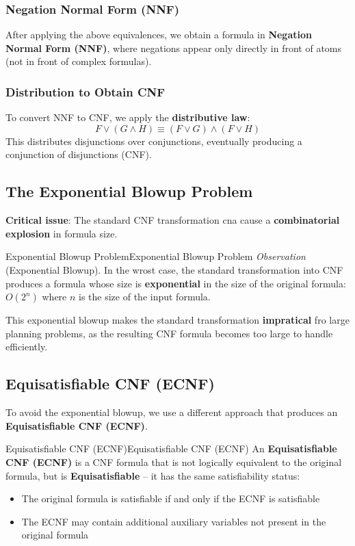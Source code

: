\documentclass[a4paper]{article}
\theoremstyle{definition}
\begin{document}
\subsubsection{Negation Normal Form (NNF)}
After applying the above equivalences, we obtain a formula in \textbf{Negation Normal Form (NNF)}, where negations appear only 
directly in front of atoms (not in front of complex formulas).
\subsubsection{Distribution to Obtain CNF}
To convert NNF to CNF, we apply the \textbf{distributive law}:
\[
  F \vee (G \wedge H) \equiv (F \vee G) \wedge (F \vee H)
\]
This distributes disjunctions over conjunctions, eventually producing a conjunction of disjunctions (CNF).
\subsection{The Exponential Blowup Problem}
\textbf{Critical issue}: The standard CNF transformation cna cause a \textbf{combinatorial explosion} in formula size.
\begin{theorem}{Exponential Blowup Problem}{Exponential Blowup Problem}
\textit{Observation} (Exponential Blowup). In the wrost case, the standard transformation into CNF produces a formula 
whose size is \textbf{exponential} in the size of the original formula:
\newline
\( O(2^n) \) where \( n \) is the size of the input formula.
\end{theorem}
This exponential blowup makes the standard transformation \textbf{impratical} fro large planning problems, as 
the resulting CNF formula becomes too large to handle efficiently.
\subsection{Equisatisfiable CNF (ECNF)}
To avoid the exponential blowup, we use a different approach that produces an \textbf{Equisatisfiable CNF (ECNF)}.
\begin{definition}{Equisatisfiable CNF (ECNF)}{Equisatisfiable CNF (ECNF)}
An \textbf{Equisatisfiable CNF (ECNF)} is a CNF formula that is not logically equivalent to the original formula, but is 
\textbf{Equisatisfiable} -- it has the same satisfiability status:
\begin{itemize}
    \item The original formula is satisfiable if and only if the ECNF is satisfiable 
    \item The ECNF may contain additional auxiliary variables not present in the original formula
\end{itemize}
\end{definition}
\end{document}
